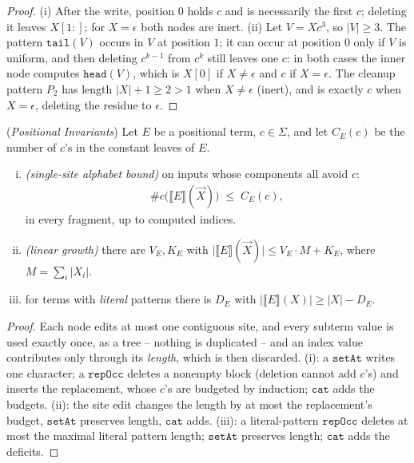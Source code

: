 \documentclass[runningheads,envcountsect]{llncs}
\begin{document}
\begin{proof}
    (i) After the write, position $0$ holds $c$ and is necessarily the first $c$; deleting it leaves $X[1:]$; for $X = \epsilon$ both nodes are inert. (ii) Let $V = Xc^3$, so $|V| \geq 3$. The pattern $\mathtt{tail}(V)$ occurs in $V$ at position $1$; it can occur at position $0$ only if $V$ is uniform, and then deleting $c^{k-1}$ from $c^k$ still leaves one $c$: in both cases the inner node computes $\mathtt{head}(V)$, which is $X[0]$ if $X \neq \epsilon$ and $c$ if $X = \epsilon$. The cleanup pattern $P_2$ has length $|X|+1 \geq 2 > 1$ when $X \neq \epsilon$ (inert), and is exactly $c$ when $X = \epsilon$, deleting the residue to $\epsilon$.
\end{proof}

\begin{theorem}
    (\emph{Positional Invariants})
    \label{thm:pos-invariants}
    Let $E$ be a positional term, $c \in \Sigma$, and let $C_E(c)$ be the number of $c$'s in the constant leaves of $E$.
    \begin{enumerate}[(i)]
        \item \emph{(single-site alphabet bound)} on inputs whose components all avoid $c$:
        \begin{align*}
            \#c\big(\llbracket E \rrbracket(\vec X)\big) \;\leq\; C_E(c),
        \end{align*}
        in every fragment, up to computed indices.
        \item \emph{(linear growth)} there are $V_E, K_E$ with $\big|\llbracket E \rrbracket(\vec X)\big| \leq V_E \cdot M + K_E$, where $M = \sum_i |X_i|$.
        \item for terms with \emph{literal} patterns there is $D_E$ with $\big|\llbracket E \rrbracket(X)\big| \geq |X| - D_E$.
    \end{enumerate}
\end{theorem}

\begin{proof}
    Each node edits at most one contiguous site, and every subterm value is used exactly once, as a tree -- nothing is duplicated -- and an index value contributes only through its \emph{length}, which is then discarded. (i): a $\mathtt{setAt}$ writes one character; a $\mathtt{repOcc}$ deletes a nonempty block (deletion cannot add $c$'s) and inserts the replacement, whose $c$'s are budgeted by induction; $\mathtt{cat}$ adds the budgets. (ii): the site edit changes the length by at most the replacement's budget, $\mathtt{setAt}$ preserves length, $\mathtt{cat}$ adds. (iii): a literal-pattern $\mathtt{repOcc}$ deletes at most the maximal literal pattern length; $\mathtt{setAt}$ preserves length; $\mathtt{cat}$ adds the deficits.
\end{proof}
\end{document}
